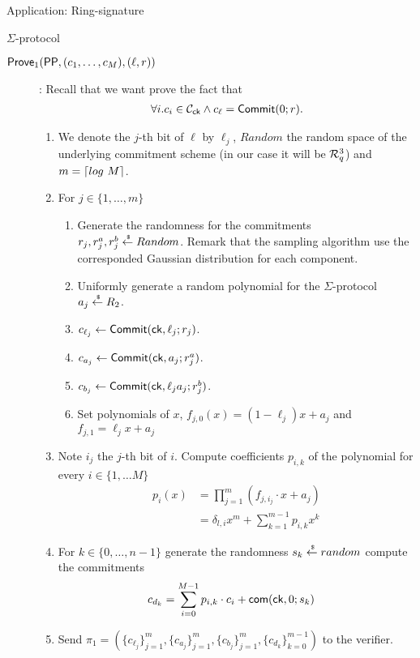 \begin{section}{Application: Ring-signature}
\begin{subsection}{$\Sigma$-protocol}
\begin{description}
      \item[${\mathsf{Prove}}_1({\mathsf{PP}}, (c_1, \dots, c_M), (\ell, r))$]:
      Recall that we want prove the fact that
      \begin{align*}
        \forall i. c_i \in \mathcal{C}_{\mathsf{ck}} \wedge c_\ell = {\mathsf{Commit}}(0; r).
      \end{align*}
      \begin{enumerate}
        \item We denote the $j$-th bit of $\ell$ by $\ell_j$,
        $Random$ the random space of the underlying commitment scheme (in our case it will be ${\mathcal{R}}_q^3$)
          and $m = \lceil log~M\rceil$.
          \item For $j \in \{1, \dots, m\}$
          \begin{enumerate}
            \item Generate the randomness for the commitments
            $r_j, r^a_j, r^b_j \stackrel{{\scriptscriptstyle \mkern4mu \$}}{\gets} Random$. Remark that the sampling algorithm use the corresponded Gaussian distribution for each component.
            \item Uniformly generate a random polynomial for the $\Sigma$-protocol $a_j \stackrel{{\scriptscriptstyle \mkern4mu \$}}{\gets} R_2$.
            \item $c_{\ell_j} \gets {\mathsf{Commit}}(\mathsf{ck}, \ell_j; r_j)$.
            \item $c_{a_j} \gets {\mathsf{Commit}}(\mathsf{ck}, a_j; r^a_j)$.
            \item $c_{b_j} \gets {\mathsf{Commit}}(\mathsf{ck}, \ell_j a_j; r^b_j)$.
            \item Set polynomials of $x$, $f_{j,0}(x) = (1 - \ell_j) x + a_j$ and $f_{j,1} = \ell_j x+a_j$
          \end{enumerate}
          \item Note $i_j$ the $j$-th bit of $i$. Compute coefficients $p_{i,k}$ of the polynomial for every $i \in \{1, \dots M\}$
          \begin{align*}
            p_i(x) &= \prod_{j=1}^{m} (f_{j,i_j} \cdot x + a_j)\\
            &= \delta_{l,i} x^m + \sum_{k = 1}^{m-1} p_{i,k} x^k
          \end{align*}

          \item For $k \in \{0, \dots, n-1\}$ generate the randomness $s_k \stackrel{{\scriptscriptstyle \mkern4mu \$}}{\gets} random$
          compute the commitments
          \begin{align*}
            c_{d_k} &= \sum_{i = 0}^{M-1} p_{i,k} \cdot c_i + \mathsf{com}(\mathsf{ck}, 0; s_k)
          \end{align*}
          \item Send $\pi_1 = (\{c_{\ell_j}\}_{j = 1}^m, \{c_{a_j}\}_{j = 1}^m,\{c_{b_j}\}_{j = 1}^m,\{c_{d_k}\}_{k = 0}^{m-1})$ to the verifier.
        \end{enumerate}






\end{description}
\end{subsection}
\end{section}

